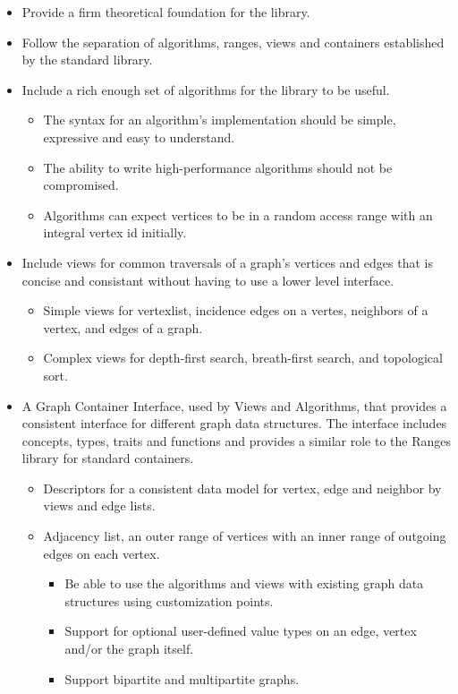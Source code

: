 \begin{itemize}
      \item Provide a firm theoretical foundation for the library.
      \item Follow the separation of algorithms, ranges, views and containers established by the standard library.
      \item Include a rich enough set of algorithms for the library to be useful.
            \begin{itemize}
                  \item The syntax for an algorithm's implementation should be simple, expressive and easy to understand. 
                  \item The ability to write high-performance algorithms should not be compromised.
                  \item Algorithms can expect vertices to be in a random access range with an integral vertex id initially.
            \end{itemize}
      \item Include views for common traversals of a graph's vertices and edges that is concise and consistant without having to use a lower level interface.
            \begin{itemize}
                  \item Simple views for vertexlist, incidence edges on a vertes, neighbors of a vertex, and edges of a graph.
                  \item Complex views for depth-first search, breath-first search, and topological sort.
            \end{itemize}
      \item A Graph Container Interface, used by Views and Algorithms, that provides a consistent interface for different graph data structures. The interface
            includes concepts, types, traits and functions and provides a similar role to the Ranges library for standard containers.
            \begin{itemize}
                  \item Descriptors for a consistent data model for vertex, edge and neighbor by views and edge lists.

                  \item Adjacency list, an outer range of vertices with an inner range of outgoing edges on each vertex.
                        \begin{itemize}
                              \item Be able to use the algorithms and views with existing graph data structures using customization points.
                              \item Support for optional user-defined value types on an edge, vertex and/or the graph itself.
                              \item Support bipartite and multipartite graphs.
                        \end{itemize}


\end{itemize}
\end{itemize}
